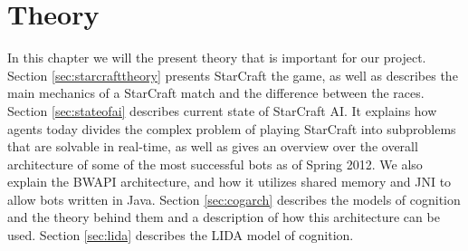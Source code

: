
\chapter{Theory}
In this chapter we will the present theory that is important for our project.
Section \ref{sec:starcrafttheory} presents StarCraft the game, as well as
describes the main mechanics of a StarCraft match and the difference between the
races. Section \ref{sec:stateofai} describes current state of StarCraft AI. It
explains how agents today divides the complex problem of playing StarCraft into
subproblems that are solvable in real-time, as well as gives an overview over
the overall architecture of some of the most successful bots as of Spring
2012. We also explain the BWAPI architecture, and how it utilizes shared memory
and JNI to allow bots written in Java. Section \ref{sec:cogarch} describes the
models of cognition and the theory
behind them and a description of how this architecture can be used.
Section \ref{sec:lida} describes the LIDA model of cognition.



